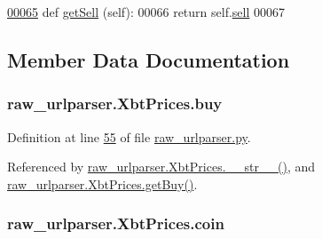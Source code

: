 \begin{DoxyCode}
\hypertarget{classraw__urlparser_1_1_xbt_prices.tex_l00065}{}\hyperlink{classraw__urlparser_1_1_xbt_prices_a1a1d7e7b76f611ae334b0950b334dda1}{00065}     \textcolor{keyword}{def }\hyperlink{classraw__urlparser_1_1_xbt_prices_a1a1d7e7b76f611ae334b0950b334dda1}{getSell} (self):
00066         \textcolor{keywordflow}{return} self.\hyperlink{classraw__urlparser_1_1_xbt_prices_a22b483cac27a5b17f9e7b265c219bb99}{sell}
00067         
\end{DoxyCode}


\subsection{Member Data Documentation}
\subsubsection[{\texorpdfstring{buy}{buy}}]{\setlength{\rightskip}{0pt plus 5cm}raw\+\_\+urlparser.\+Xbt\+Prices.\+buy}\hypertarget{classraw__urlparser_1_1_xbt_prices_a87eba659d6598ffd66c694535e1b7a7a}{}\label{classraw__urlparser_1_1_xbt_prices_a87eba659d6598ffd66c694535e1b7a7a}


Definition at line \hyperlink{raw__urlparser_8py_source_l00055}{55} of file \hyperlink{raw__urlparser_8py_source}{raw\+\_\+urlparser.\+py}.



Referenced by \hyperlink{raw__urlparser_8py_source_l00074}{raw\+\_\+urlparser.\+Xbt\+Prices.\+\_\+\+\_\+str\+\_\+\+\_\+()}, and \hyperlink{raw__urlparser_8py_source_l00062}{raw\+\_\+urlparser.\+Xbt\+Prices.\+get\+Buy()}.

\subsubsection[{\texorpdfstring{coin}{coin}}]{\setlength{\rightskip}{0pt plus 5cm}raw\+\_\+urlparser.\+Xbt\+Prices.\+coin}\hypertarget{classraw__urlparser_1_1_xbt_prices_a8d253ccd987bce28e3aaba7a9c486e5f}{}\label{classraw__urlparser_1_1_xbt_prices_a8d253ccd987bce28e3aaba7a9c486e5f}


